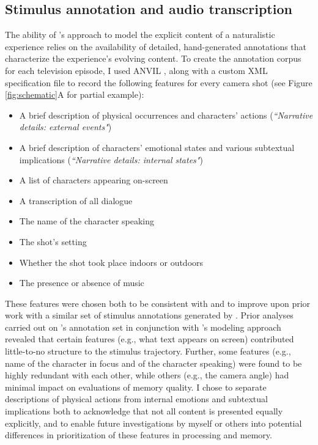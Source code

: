 \documentclass{article}
\begin{document}
\subsection*{Stimulus annotation and audio transcription}
The ability of \cite{HeusEtal18c}'s approach to model the explicit content of a naturalistic experience relies on the availability of detailed, hand-generated annotations that characterize the experience's evolving content.  To create the annotation corpus for each television episode, I used ANVIL \citep{Kipp01}, along with a custom XML specification file to record the following features for every camera shot (see Figure \ref{fig:schematic}A for partial example):

\singlespacing
\begin{itemize}
	\item A brief description of physical occurrences and characters’ actions (\textit{``Narrative details: external events"})
	\item A brief description of characters’ emotional states and various subtextual implications (\textit{``Narrative details: internal states"})
	\item A list of characters appearing on-screen
	\item A transcription of all dialogue
	\item The name of the character speaking
	\item The shot’s setting
	\item Whether the shot took place indoors or outdoors
	\item The presence or absence of music
\end{itemize}
\doublespacing

These features were chosen both to be consistent with and to improve upon prior work with a similar set of stimulus annotations generated by \cite{ChenEtal17}.  Prior analyses carried out on \cite{ChenEtal17}'s annotation set in conjunction with \cite{HeusEtal18c}'s modeling approach revealed that certain features (e.g., what text appears on screen) contributed little-to-no structure to the stimulus trajectory.  Further, some features (e.g., name of the character in focus and of the character speaking) were found to be highly redundant with each other, while others (e.g., the camera angle) had minimal impact on evaluations of memory quality.  I chose to separate descriptions of physical actions from internal emotions and subtextual implications both to acknowledge that not all content is presented equally explicitly, and to enable future investigations by myself or others into potential differences in prioritization of these features in processing and memory. 
\end{document}
